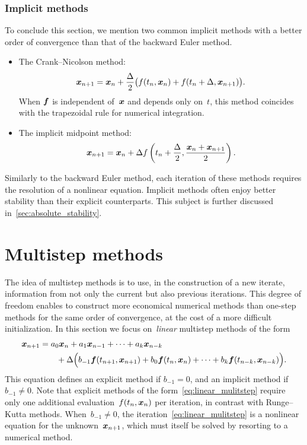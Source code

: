 \subsubsection*{Implicit methods}%
To conclude this section,
we mention two common implicit methods with a better order of convergence than that of the backward Euler method.
\begin{itemize}
    \item
        The Crank--Nicolson method:
        \begin{equation}
            \label{eq:crank_nicolson}
            \mathbf{\boldsymbol{x}}_{n+1} = \mathbf{\boldsymbol{x}}_n + \frac{\Delta}{2} \bigl( f(t_n, \mathbf{\boldsymbol{x}}_n) + f(t_n + \Delta, \mathbf{\boldsymbol{x}}_{n+1}) \bigr).
        \end{equation}
        When $\mathbf{\boldsymbol{f}}$ is independent of~$\mathbf{\boldsymbol{x}}$ and depends only on~$t$,
        this method coincides with the trapezoidal rule for numerical integration.

    \item
        The implicit midpoint method:
        \[
            \mathbf{\boldsymbol{x}}_{n+1} = \mathbf{\boldsymbol{x}}_n + \Delta  f\left(t_n + \frac{\Delta}{2}, \frac{\mathbf{\boldsymbol{x}}_n + \mathbf{\boldsymbol{x}}_{n+1}}{2} \right).
        \]
\end{itemize}
Similarly to the backward Euler method,
each iteration of these methods requires the resolution of a nonlinear equation.
Implicit methods often enjoy better stability than their explicit counterparts.
This subject is further discussed in~\cref{sec:absolute_stability}.

\section{Multistep methods}
\label{sec:multistep_methods}
The idea of multistep methods is to use,
in the construction of a new iterate,
information from not only the current but also previous iterations.
This degree of freedom enables to construct more economical numerical methods than one-step methods for the same order of convergence,
at the cost of a more difficult initialization.
In this section we focus on~\emph{linear} multistep methods of the form
 \begin{align}
     \nonumber
     \mathbf{\boldsymbol{x}}_{n+1}  &= a_0 \mathbf{\boldsymbol{x}}_n + a_1 \mathbf{\boldsymbol{x}}_{n-1} + \dotsb + a_{k} \mathbf{\boldsymbol{x}}_{n-k} \\
     \label{eq:linear_mulitstep}
                    &\qquad + \Delta \Bigl( b_{-1} \mathbf{\boldsymbol{f}}(t_{n+1}, \mathbf{\boldsymbol{x}}_{n+1}) + b_0 \mathbf{\boldsymbol{f}}(t_{n}, \mathbf{\boldsymbol{x}}_{n}) + \dotsb + b_k \mathbf{\boldsymbol{f}}(t_{n-k}, \mathbf{\boldsymbol{x}}_{n-k}) \Bigr).
\end{align}
This equation defines an explicit method if $b_{-1} = 0$,
and an implicit method if $b_{-1} \neq 0$.
Note that explicit methods of the form~\eqref{eq:linear_mulitstep} require only one additional evaluation~$f(t_{n}, \mathbf{\boldsymbol{x}}_{n})$ per iteration,
in contrast with Runge--Kutta methods.
When~$b_{-1} \neq 0$, the iteration~\eqref{eq:linear_mulitstep} is a nonlinear equation for the unknown~$\mathbf{\boldsymbol{x}}_{n+1}$,
which must itself be solved by resorting to a numerical method.

